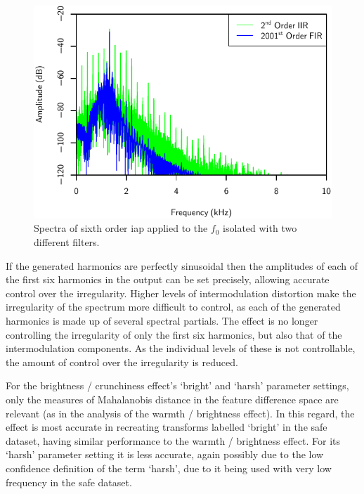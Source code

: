 			\begin{figure}[h!]
				\centering
				\includegraphics{chapter7/Images/CelloFilterOrderSpectra.pdf}
				\caption{Spectra of sixth order \acrshort{iap} applied to the $f_{0}$ isolated with two
					 different filters.}
				\label{fig:CelloFilterOrderSpectra}
			\end{figure}

			If the generated harmonics are perfectly sinusoidal then the amplitudes of each of the first six
			harmonics in the output can be set precisely, allowing accurate control over the irregularity.
			Higher levels of intermodulation distortion make the irregularity of the spectrum more difficult to
			control, as each of the generated harmonics is made up of several spectral partials. The effect is
			no longer controlling the irregularity of only the first six harmonics, but also that of the
			intermodulation components. As the individual levels of these is not controllable, the amount of
			control over the irregularity is reduced.

			For the brightness / crunchiness effect's `bright' and `harsh' parameter settings, only the
			measures of Mahalanobis distance in the feature difference space are relevant (as in the analysis
			of the warmth / brightness effect). In this regard, the effect is most accurate in recreating
			transforms labelled `bright' in the \acrshort{safe} dataset, having similar performance to the
			warmth / brightness effect.  For its `harsh' parameter setting it is less accurate, again possibly
			due to the low confidence definition of the term `harsh', due to it being used with very low
			frequency in the \acrshort{safe} dataset.

